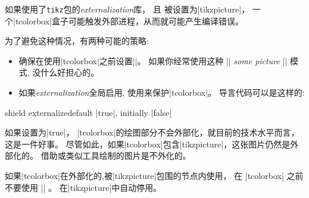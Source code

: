 
如果使用了\texttt{tikz}包的\emph{externalization}库，%
且 被设置为|tikzpicture|，%
一个|tcolorbox|盒子可能触发外部进程，从而就可能产生编译错误。


为了避免这种情况，有两种可能的策略:
\begin{itemize}
\item 
确保在使用|tcolorbox|之前设置|\tikzexternaldisable|。%
如果你经常使用这种 |\tikzexternalenable| \textit{some picture} |\tikzexternaldisable| 模式,
没什么好担心的。
\item 
如果\emph{externalization}全局启用, 使用来保护|tcolorbox|。%
导言代码可以是这样的:
\begin{dispListing}
\usetikzlibrary{external}
\tikzexternalize
{}
\end{dispListing}
\end{itemize}

\begin{docTcbKey}{shield externalize}{}{default |true|, initially |false|}
  
  如果设置为|true|， |tcolorbox|的绘图部分不会外部化，就目前的技术水平而言，这是一件好事。%
  尽管如此，如果|tcolorbox|包含|tikzpicture|，这张图片仍然是外部化的。%
  借助或类似工具绘制的图片是不外化的。
  \end{docTcbKey}
  
  \begin{marker}
  如果|tcolorbox|在外部化的,被|tikzpicture|包围的节点内使用，%
  在 |tcolorbox| 之前不要使用 |\tikzexternaldisable| 。%
  在|tikzpicture|中自动停用。
  \end{marker}

